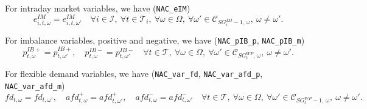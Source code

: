\documentclass{article}
\begin{document}
For intraday market variables, we have (\verb|NAC_eIM|)
\begin{equation} \label{EQ:NAC_IM}
    e^{IM}_{i,t,\omega} = e^{IM}_{i,t,\omega'}
    \quad \forall i \in \mathcal{I},\ \forall t \in \mathcal{T}_i,\
    \forall \omega \in \Omega,\ \forall \omega' \in \mathcal{C}_{SG^{IM}_i - 1,\, \omega},\
    \omega \neq \omega'.
\end{equation}

For imbalance variables, positive and negative, we have
(\verb|NAC_pIB_p|, \verb|NAC_pIB_m|)
\begin{equation} \label{EQ:NAC_pPIB}
    p^{IB+}_{t,\omega} = p^{IB+}_{t,\omega'}, \quad
    p^{IB-}_{t,\omega} = p^{IB-}_{t,\omega'}
    \quad \forall t \in \mathcal{T},\ \forall \omega \in \Omega,\
    \forall \omega' \in \mathcal{C}_{SG^{WP}_t,\, \omega},\ \omega \neq \omega'.
\end{equation}

For flexible demand variables, we have
(\verb|NAC_var_fd|, \verb|NAC_var_afd_p|, \verb|NAC_var_afd_m|)
\begin{equation} \label{EQ:NAC_FD}
    fd_{t,\omega} = fd_{t,\omega'}, \quad
    afd^+_{t,\omega} = afd^+_{t,\omega'}, \quad
    afd^-_{t,\omega} = afd^-_{t,\omega'}
    \quad \forall t \in \mathcal{T},\ \forall \omega \in \Omega,\
    \forall \omega' \in \mathcal{C}_{SG^{WP}_t - 1,\, \omega},\ \omega \neq \omega'.
\end{equation}
\end{document}
